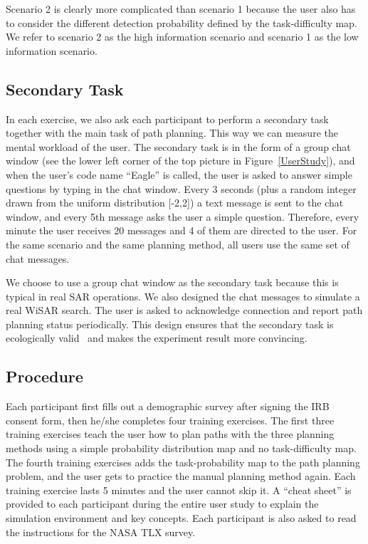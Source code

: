\documentclass[journal]{IEEEtran}
\begin{document}
Scenario 2 is clearly more complicated than scenario 1 because the user also has to consider the different detection probability defined by the task-difficulty map. We refer to scenario 2 as the high information scenario and scenario 1 as the low information scenario.

\subsection{Secondary Task}

In each exercise, we also ask each participant to perform a secondary task together with the main task of path planning. This way we can measure the mental workload of the user. The secondary task is in the form of a group chat window (see the lower left corner of the top picture in Figure~\ref{UserStudy}), and when the user's code name ``Eagle'' is called, the user is asked to answer simple questions by typing in the chat window. Every 3 seconds (plus a random integer drawn from the uniform distribution [-2,2]) a text message is sent to the chat window, and every 5th message asks the user a simple question. Therefore, every minute the user receives 20 messages and 4 of them are directed to the user. For the same scenario and the same planning method, all users use the same set of chat messages.

We choose to use a group chat window as the secondary task because this is typical in real SAR operations. We also designed the chat messages to simulate a real WiSAR search. The user is asked to acknowledge connection and report path planning status periodically. This design ensures that the secondary task is ecologically valid~\cite{Vicente1997Should,Rasmussen1994Cognitive} and makes the experiment result more convincing.

\subsection{Procedure}

Each participant first fills out a demographic survey after signing the IRB consent form, then he/she completes four training exercises. The first three training exercises teach the user how to plan paths with the three planning methods using a simple probability distribution map and no task-difficulty map. The fourth training exercises adds the task-probability map to the path planning problem, and the user gets to practice the manual planning method again. Each training exercise lasts 5 minutes and the user cannot skip it. A ``cheat sheet'' is provided to each participant during the entire user study to explain the simulation environment and key concepts. Each participant is also asked to read the instructions for the NASA TLX survey.
\end{document}
